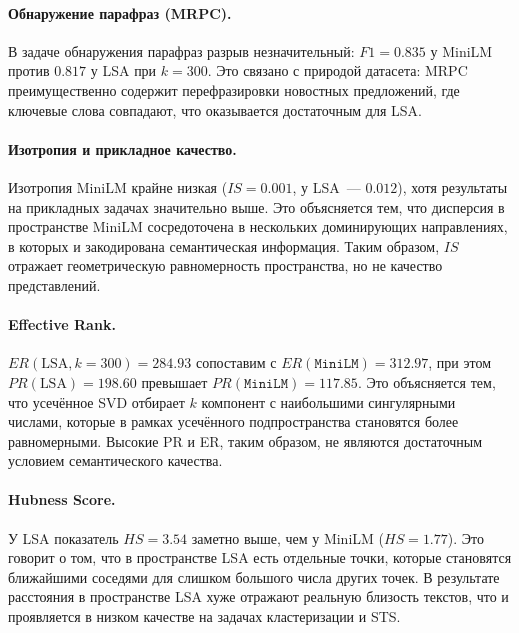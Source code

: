 \paragraph{Обнаружение парафраз (MRPC).}
В задаче обнаружения парафраз разрыв незначительный: $F1 = 0.835$ у
MiniLM против $0.817$ у LSA при $k = 300$. Это связано с природой
датасета: MRPC преимущественно содержит перефразировки новостных
предложений, где ключевые слова совпадают, что оказывается достаточным
для LSA.

\paragraph{Изотропия и прикладное качество.}
Изотропия MiniLM крайне низкая ($IS = 0.001$, у LSA~--- $0.012$), хотя
результаты на прикладных задачах значительно выше. Это объясняется тем,
что дисперсия в пространстве MiniLM сосредоточена в нескольких
доминирующих направлениях, в которых и закодирована семантическая
информация. Таким образом, $IS$ отражает геометрическую равномерность
пространства, но не качество представлений.

\paragraph{Effective Rank.}
$ER(\text{LSA}, k{=}300) = 284.93$ сопоставим с $ER(\texttt{MiniLM}) =
312.97$, при этом $PR(\text{LSA}) = 198.60$ превышает
$PR(\texttt{MiniLM}) = 117.85$. Это объясняется тем, что усечённое SVD
отбирает $k$ компонент с наибольшими сингулярными числами, которые
в рамках усечённого подпространства становятся более равномерными.
Высокие PR и ER, таким образом, не являются достаточным условием
семантического качества.



\paragraph{Hubness Score.}
У LSA показатель $HS = 3.54$ заметно выше, чем у MiniLM ($HS =
1.77$). Это говорит о том, что в пространстве LSA есть отдельные
точки, которые становятся ближайшими соседями для слишком большого
числа других точек. В результате расстояния в пространстве LSA хуже
отражают реальную близость текстов, что и проявляется в низком
качестве на задачах кластеризации и STS.

